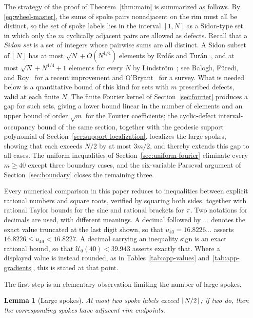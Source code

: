 \documentclass[11pt]{article}
\newtheorem{lemma}[theorem]{Lemma}
\theoremstyle{definition}
\theoremstyle{remark}
\numberwithin{equation}{section}
\DeclarePairedDelimiter{\floor}{\lfloor}{\rfloor}
\begin{document}
The strategy of the proof of Theorem~\ref{thm:main} is summarized as follows. By \eqref{eq:wheel-master}, the sums of spoke pairs nonadjacent on the rim must all be distinct, so the set of spoke labels lies in the interval $[1,N]$ as a Sidon-type set in which only the $m$ cyclically adjacent pairs are allowed as defects. Recall that a \emph{Sidon set} is a set of integers whose pairwise sums are all distinct. A Sidon subset of $[N]$ has at most $\sqrt N+O(N^{1/4})$ elements by Erd\H os and Tur\'an~\cite{ErdosTuran1941}, and at most $\sqrt N+N^{1/4}+1$ elements for every $N$ by Lindstr\"om~\cite{Lindstrom1969}; see Balogh, F\"uredi, and Roy~\cite{BaloghFurediRoy2023} for a recent improvement and O'Bryant~\cite{OBryant2004} for a survey. What is needed below is a quantitative bound of this kind for sets with $m$ prescribed defects, valid at each finite $N$. The finite Fourier kernel of Section~\ref{sec:fourier} produces a gap for such sets, giving a lower bound linear in the number of elements and an upper bound of order $\sqrt m$ for the Fourier coefficients; the cyclic-defect interval-occupancy bound of the same section, together with the geodesic support polynomial of Section~\ref{sec:support-localization}, localizes the large spokes, showing that each exceeds $N/2$ by at most $3m/2$, and thereby extends this gap to all cases. The uniform inequalities of Section~\ref{sec:uniform-fourier} eliminate every $m\ge40$ except three boundary cases, and the six-variable Parseval argument of Section~\ref{sec:boundary} closes the remaining three.

Every numerical comparison in this paper reduces to inequalities between
explicit rational numbers and square roots, verified by squaring both sides,
together with rational Taylor bounds for the sine and rational brackets for
$\pi$. Two notations for decimals are used, with different meanings. A decimal
followed by $\ldots$ denotes the exact value truncated at the last digit shown,
so that $u_{40}=16.8226\ldots$ asserts $16.8226\le u_{40}<16.8227$. A decimal
carrying an inequality sign is an exact rational bound, so that
$\mathcal U_0(40)<39.943$ asserts exactly that. Where a displayed value is
instead rounded, as in Tables~\ref{tab:app-values}
and~\ref{tab:app-gradients}, this is stated at that point.

The first step is an elementary observation limiting the number of large spokes.

\begin{lemma}[Large spokes]\label{lem:large-spokes}
At most two spoke labels exceed $\floor{N/2}$; if two do, then the corresponding spokes have adjacent rim endpoints.
\end{lemma}
\end{document}
